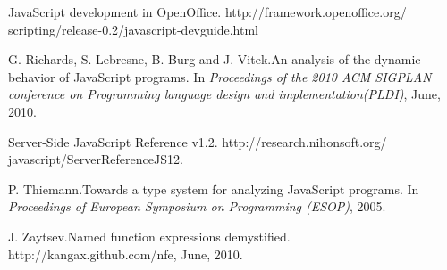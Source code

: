 \documentclass{acm_proc_article-sp}
\begin{document}
\begin{thebibliography}{10}
JavaScript development in OpenOffice.
\newblock http://framework.openoffice.org/ scripting/release-0.2/javascript-devguide.html

G. Richards, S. Lebresne, B. Burg and J. Vitek.\newblock An analysis of the dynamic behavior of JavaScript programs.
\newblock In \emph{Proceedings of the 2010 ACM SIGPLAN conference on Programming language design and implementation(PLDI)},
June, 2010.

Server-Side JavaScript Reference v1.2.
\newblock http://research.nihonsoft.org/ javascript/ServerReferenceJS12.

P. Thiemann.\newblock Towards a type system for analyzing JavaScript programs.
\newblock In \emph{Proceedings of European Symposium on Programming (ESOP)},
2005.

J. Zaytsev.\newblock Named function expressions demystified.
\newblock http://kangax.github.com/nfe,
June, 2010.


\end{thebibliography}
\end{document}

